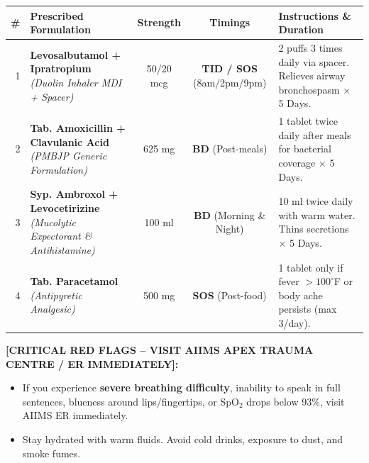 \documentclass[9pt,a4paper]{article}
\begin{document}
\begin{tcolorbox}[
    colback=white,
    colframe=primary,
    arc=3mm,
    boxrule=1.5pt,
    left=8pt, right=8pt, top=5pt, bottom=5pt
]
\vspace{1pt}
\begin{tabularx}{\linewidth}{|r|X|c|c|X|}
\hline
\textbf{\#} & \textbf{Prescribed Formulation} & \textbf{Strength} & \textbf{Timings} & \textbf{Instructions \& Duration} \\
\hline
1 & \textbf{Levosalbutamol + Ipratropium} \newline \textit{(Duolin Inhaler MDI + Spacer)} & 50/20 mcg & \textbf{TID / SOS} (8am/2pm/9pm) & 2 puffs 3 times daily via spacer. Relieves airway bronchospasm $\times$ 5 Days. \\
\hline
2 & \textbf{Tab. Amoxicillin + Clavulanic Acid} \newline \textit{(PMBJP Generic Formulation)} & 625 mg & \textbf{BD} (Post-meals) & 1 tablet twice daily after meals for bacterial coverage $\times$ 5 Days. \\
\hline
3 & \textbf{Syp. Ambroxol + Levocetirizine} \newline \textit{(Mucolytic Expectorant \& Antihistamine)} & 100 ml & \textbf{BD} (Morning \& Night) & 10 ml twice daily with warm water. Thins secretions $\times$ 5 Days. \\
\hline
4 & \textbf{Tab. Paracetamol} \newline \textit{(Antipyretic Analgesic)} & 500 mg & \textbf{SOS} (Post-food) & 1 tablet only if fever $> 100^\circ$F or body ache persists (max 3/day). \\
\hline
\end{tabularx}

\vspace{2pt}
\begin{tcolorbox}[colback=warningbg, colframe=primary, arc=2mm, boxrule=0.8pt, left=5pt, right=5pt, top=2pt, bottom=2pt]
    \textbf{\color{primarydark}[CRITICAL RED FLAGS -- VISIT AIIMS APEX TRAUMA CENTRE / ER IMMEDIATELY]:}
    \begin{itemize}[leftmargin=12pt, topsep=1pt, itemsep=0pt]
        \item If you experience \textbf{severe breathing difficulty}, inability to speak in full sentences, blueness around lips/fingertips, or SpO$_2$ drops below 93\%, visit AIIMS ER immediately.
        \item Stay hydrated with warm fluids. Avoid cold drinks, exposure to dust, and smoke fumes.
    \end{itemize}
\end{tcolorbox}


\end{tcolorbox}
\end{document}
